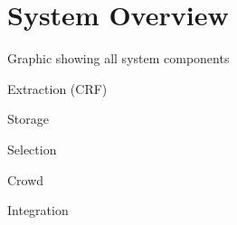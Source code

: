 \section{System Overview}

Graphic showing all system components \newline

\noindent Extraction (CRF) \newline

\noindent Storage \newline

\noindent Selection \newline

\noindent Crowd \newline

\noindent Integration
